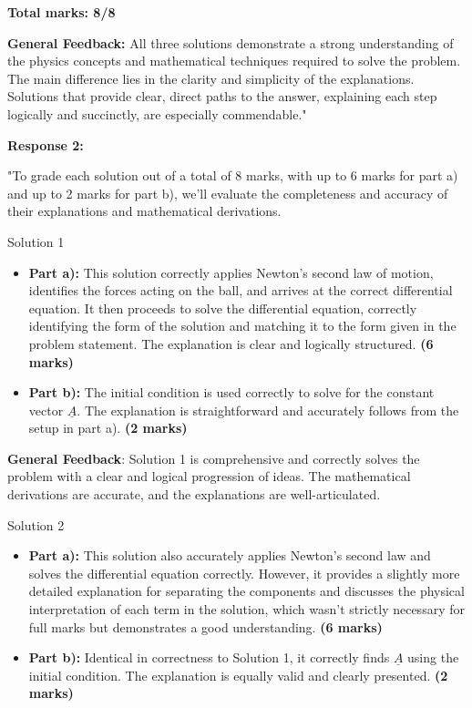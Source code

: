 \documentclass[a4paper,11pt]{article}
\begin{document}
\textbf{Total marks: 8/8}

\textbf{General Feedback:} All three solutions demonstrate a strong understanding of the physics concepts and mathematical techniques required to solve the problem. The main difference lies in the clarity and simplicity of the explanations. Solutions that provide clear, direct paths to the answer, explaining each step logically and succinctly, are especially commendable."

\textbf{Response 2:}

"To grade each solution out of a total of 8 marks, with up to 6 marks for part a) and up to 2 marks for part b), we'll evaluate the completeness and accuracy of their explanations and mathematical derivations.

Solution 1

\begin{itemize}
    \item \textbf{Part a):} This solution correctly applies Newton's second law of motion, identifies the forces acting on the ball, and arrives at the correct differential equation. It then proceeds to solve the differential equation, correctly identifying the form of the solution and matching it to the form given in the problem statement. The explanation is clear and logically structured. \textbf{(6 marks)}
    \item \textbf{Part b):} The initial condition is used correctly to solve for the constant vector \( \underline{A} \). The explanation is straightforward and accurately follows from the setup in part a). \textbf{(2 marks)}
\end{itemize}

\textbf{General Feedback}: Solution 1 is comprehensive and correctly solves the problem with a clear and logical progression of ideas. The mathematical derivations are accurate, and the explanations are well-articulated.

Solution 2

\begin{itemize}
    \item \textbf{Part a):} This solution also accurately applies Newton's second law and solves the differential equation correctly. However, it provides a slightly more detailed explanation for separating the components and discusses the physical interpretation of each term in the solution, which wasn't strictly necessary for full marks but demonstrates a good understanding. \textbf{(6 marks)}
    \item \textbf{Part b):} Identical in correctness to Solution 1, it correctly finds \( \underline{A} \) using the initial condition. The explanation is equally valid and clearly presented. \textbf{(2 marks)}
\end{itemize}
\end{document}
